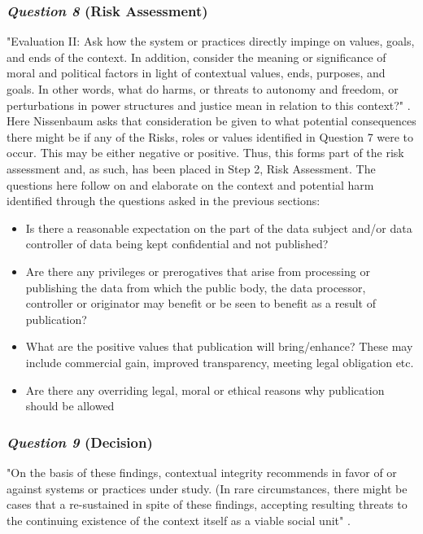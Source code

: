 \subsubsection {{\it Question 8} {\bf(Risk Assessment)}}
"Evaluation II: Ask how the system or practices directly impinge on values, goals, and ends of the context. In addition, consider the meaning or significance of moral and political factors in light of contextual values, ends, purposes, and goals. In other words, what do harms, or threats to autonomy and freedom, or perturbations in power structures and justice mean in relation to this context?" \cite{Nissenbaum_2010}.\\

Here Nissenbaum asks that consideration be given to what potential consequences there might be if any of the Risks, roles or values identified in Question 7 were to occur. This may be either negative or positive.  Thus, this forms part of the risk assessment and, as such, has been placed in Step 2, Risk Assessment. The questions here follow on and elaborate on the context and potential harm identified through the questions asked in the previous sections: 
\begin{itemize}
\item Is there a reasonable expectation on the part of the data subject and/or data controller of data being kept confidential and not published?
\item Are there any privileges or prerogatives that arise from processing or publishing the data from which the public body, the data processor, controller or originator may benefit or be seen to benefit as a result of publication?
\item What are the positive values that publication will bring/enhance? These may include commercial gain, improved transparency, meeting legal obligation etc.
\item Are there any overriding legal, moral or ethical reasons why publication should be allowed 
\end{itemize}
\subsubsection {{\it Question 9} {\bf(Decision)}}
"On the basis of these findings, contextual integrity recommends in favor of or against systems or practices under study. (In rare circumstances, there might be cases that a re-sustained in spite of these findings, accepting resulting threats to the continuing existence of the context itself as a viable social unit"  \cite{Nissenbaum_2010}.\\

